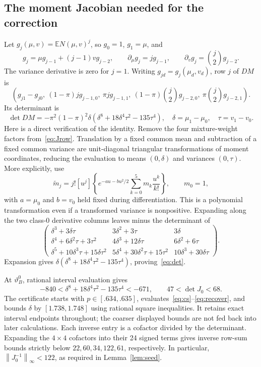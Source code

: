 \documentclass[11pt,a4paper]{article}
\numberwithin{equation}{section}
\newcommand{\E}{\mathbb E}
\newcommand{\vt}{\vartheta}
\newcommand{\norm}[1]{\left\lVert#1\right\rVert_\infty}
\begin{document}
\subsection{The moment Jacobian needed for the correction}
Let $g_j(\mu,v)=\E N(\mu,v)^j$, so $g_0=1$, $g_1=\mu$, and
\[
 g_j=\mu g_{j-1}+(j-1)v g_{j-2},\qquad
 \partial_\mu g_j=jg_{j-1},\qquad
 \partial_v g_j=\binom j2g_{j-2}.
\]
The variance derivative is zero for $j=1$. Writing $g_{jd}=g_j(\mu_d,v_d)$, row $j$ of $DM$ is
\begin{equation}\label{eq:Jrow}
 \left(g_{j1}-g_{j0},\ (1-\pi)jg_{j-1,0},\ \pi jg_{j-1,1},\
 (1-\pi)\binom j2g_{j-2,0},\ \pi\binom j2g_{j-2,1}\right).
\end{equation}
Its determinant is
\begin{equation}\label{eq:det}
 \det DM=-\pi^2(1-\pi)^2\delta
       (\delta^8+18\delta^4\tau^2-135\tau^4),
 \quad\delta=\mu_1-\mu_0,\quad\tau=v_1-v_0.
\end{equation}
Here is a direct verification of the identity. Remove the four mixture-weight factors from~\eqref{eq:Jrow}. Translation by a fixed common mean and subtraction of a fixed common variance are unit-diagonal triangular transformations of moment coordinates, reducing the evaluation to means $(0,\delta)$ and variances $(0,\tau)$. More explicitly, use
\[
 \widetilde m_j=j![u^j]\left\{e^{-au-bu^2/2}
          \sum_{k=0}^5m_k\frac{u^k}{k!}\right\},\qquad m_0=1,
\]
with $a=\mu_0$ and $b=v_0$ held fixed during differentiation. This is a polynomial transformation even if a transformed variance is nonpositive. Expanding along the two class-0 derivative columns leaves minus the determinant of
\[
 \begin{pmatrix}
 \delta^3+3\delta\tau&3\delta^2+3\tau&3\delta\\
 \delta^4+6\delta^2\tau+3\tau^2&4\delta^3+12\delta\tau&6\delta^2+6\tau\\
 \delta^5+10\delta^3\tau+15\delta\tau^2&5\delta^4+30\delta^2\tau+15\tau^2&10\delta^3+30\delta\tau
 \end{pmatrix}.
\]
Expansion gives $\delta(\delta^8+18\delta^4\tau^2-135\tau^4)$, proving~\eqref{eq:det}.

At $\vt_B^0$, rational interval evaluation gives
\[
 -840<\delta^8+18\delta^4\tau^2-135\tau^4<-671,
 \qquad 47<\det J_0<68.
\]
The certificate starts with $p\in[.634,.635]$, evaluates~\eqref{eq:cs}--\eqref{eq:recover}, and bounds $\delta$ by $[1.738,1.748]$ using rational square inequalities. It retains exact interval endpoints throughout; the coarser displayed bounds are not fed back into later calculations. Each inverse entry is a cofactor divided by the determinant. Expanding the $4\times4$ cofactors into their 24 signed terms gives inverse row-sum bounds strictly below $22,60,34,122,61$, respectively. In particular, $\norm{J_0^{-1}}<122$, as required in Lemma~\ref{lem:seed}.
\end{document}
